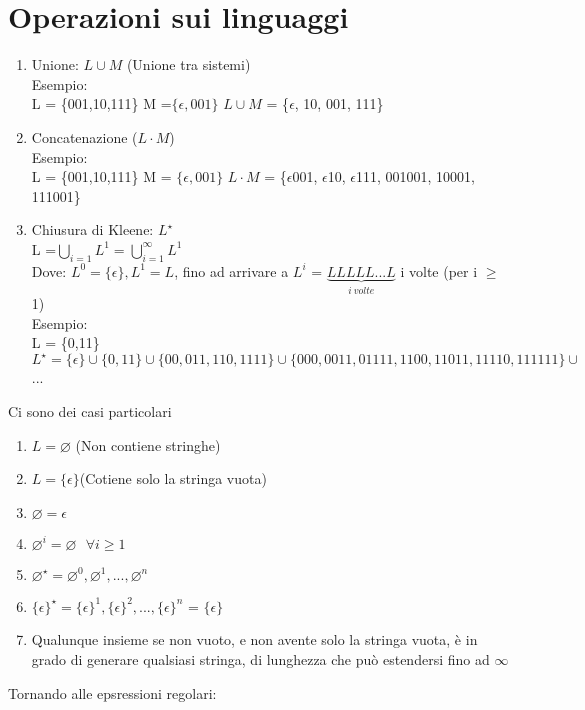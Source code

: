 \documentclass[12pt, a4paper, openany, oneside]{book}
\begin{document}
\section{Operazioni sui linguaggi}
\begin{enumerate}
	\item Unione: $L \cup M$ (Unione tra sistemi)\\
	Esempio:\\
	L = \{001,10,111\}
	M =$ \{\epsilon,001\}$
	$L \cup M$ = \{$\epsilon$, 10, 001, 111\}
	\item Concatenazione ($L\cdot M$)\\
	Esempio: \\
	L = \{001,10,111\}
	M = $\{\epsilon,001\}$
	$L \cdot M$ = \{$\epsilon$001, $\epsilon$10, $\epsilon$111, 001001, 10001, 111001\}	 
	\item Chiusura di Kleene: $L^{\star}$ \\
	L =$ \bigcup \limits _{i=1} L^{1} = \bigcup \limits _{i=1}^{\infty} L^{1}$\\
	Dove: $L^{0} = \{\epsilon\}, L^{1} = L$, fino ad arrivare a $L^{i}$ =
	$\underbrace{LLLLL...L}_{i~volte} $	i volte (per i $\geq$ 1)\\
	Esempio: \\
	L = \{0,11\} \\
	$L^{\star} = \{\epsilon\} \cup \{0,11\} \cup \{00,011,110,1111\} \cup 
	\{000,0011,01111,1100,11011,11110,111111\} \cup$ ...
\end{enumerate}
Ci sono dei casi particolari 
\begin{enumerate}
	\item $L = \varnothing $ (Non contiene stringhe)
	\item $L = \{\epsilon\} $(Cotiene solo la stringa vuota)
	\item $\varnothing = {\epsilon}$
	\item$ \varnothing^{i} = \varnothing ~~~ \forall i\geq1$
	\item $\varnothing^{\star} = \varnothing^{0}, \varnothing^{1}, ..., 
	\varnothing^{n}$
	\item $\{\epsilon\}^{\star} = \{\epsilon\}^{1}, \{\epsilon\}^{2}, ...,
	 \{\epsilon\}^{n}$  = $\{\epsilon\}$
	 \item Qualunque insieme se non vuoto, e non avente solo la stringa vuota,
	 è in grado di generare qualsiasi stringa, di lunghezza che può estendersi
	 fino ad $\infty$
\end{enumerate}
Tornando alle epsressioni regolari: \\
\end{document}
